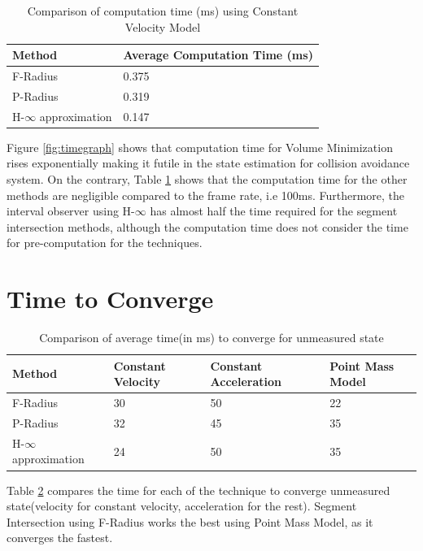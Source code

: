 \begin{table}[htbp]
\caption{Comparison of computation time (ms) using Constant Velocity Model\\}
	\centering
	\renewcommand{\arraystretch}{1.1}
	\small	
	\begin{tabular}{l l}
		\toprule 
		\textbf{Method} & \textbf{Average Computation Time (ms)}\\ \midrule
		F-Radius & 0.375\\
		P-Radius &0.319\\
		H-$\infty$ approximation & 0.147\\
		\bottomrule
	\end{tabular}
	\label{tab:comptime}
\end{table}
Figure \ref{fig:timegraph} shows that computation time for Volume Minimization rises exponentially making it futile in the state estimation for collision avoidance system. On the contrary, Table \ref{tab:comptime} shows that the computation time for the other methods are negligible compared to the frame rate, i.e 100ms. Furthermore, the interval observer using H-$\infty$ has almost half the time required for the segment intersection methods, although the computation time does not consider the time for pre-computation for the techniques.



\section{Time to Converge}
\begin{table}[htbp]
\caption{Comparison of average time(in ms) to converge for unmeasured state\\}
	\centering
	\renewcommand{\arraystretch}{1.1}
	\small	
	\begin{tabular}{l l l l}
		\toprule 
		\textbf{Method} & \textbf{Constant Velocity} & \textbf{Constant Acceleration} & \textbf{Point Mass Model} \\ \midrule
		F-Radius & 30 & 50 & 22\\
		P-Radius & 32 & 45 & 35\\
		H-$\infty$ approximation & 24 & 50 & 35\\
		\bottomrule
	\end{tabular}
	\label{tab:convtime}
\end{table}
Table \ref{tab:convtime} compares the time for each of the technique to converge unmeasured state(velocity for constant velocity, acceleration for the rest). Segment Intersection using F-Radius works the best using Point Mass Model, as it converges the fastest.


